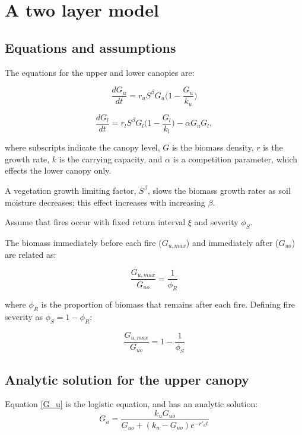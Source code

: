 \documentclass{article}
\author{octavia Crompton}
\begin{document}
\tableofcontents		
\section{ A two layer model}
\subsection{ Equations and assumptions}

The equations for the upper  and lower  canopies are:

\begin{equation}
    \frac{dG_u}{dt} =  r_{u} S^\beta G_u \big(1-\frac{G_u}{k_u}\big)
    \label{G_u}
\end{equation}

 \begin{equation}
    \frac{d G_l}{dt} = r_l S^\beta G_l \big(1-\frac{G_l}{k_l}\big) - \alpha G_u G_l,
        \label{G_l}
\end{equation}


where subscripts indicate the canopy level, $G$ is the biomass density, $r$ is the growth rate, $k$ is the carrying capacity, and $\alpha$ is a competition parameter, which effects the lower canopy only.

A vegetation growth limiting factor, $S^\beta$, slows the biomass growth rates as soil moisture decreases; this effect increases with increasing $\beta$.


Assume that fires occur with fixed return interval $\xi$  and severity $\phi_S$.

The biomass immediately before each fire  ($G_{u,max}$) and immediately after ($G_{uo}$) are related as:

\begin{equation}
    \frac{G_{u,max}}{G_{uo}} = \frac{1}{\phi_R}
\end{equation}

where $\phi_R$ is the proportion of biomass that remains after each fire.  Defining fire severity as $\phi_S = 1-\phi_R$:

\begin{equation}
    \frac{G_{u,max}}{G_{uo}} = 1 - \frac{1}{\phi_S}
\end{equation}


\subsection{  Analytic solution for the upper canopy}

Equation \ref{G_u}  is the logistic equation, and  has an analytic solution:
\begin{equation}
    G_u = \frac{k_u G_{uo}}{G_{uo} +(k_u-G_{uo}) e^{-r'_u t}}
    \label{logistic_solution}
\end{equation}
\end{document}
